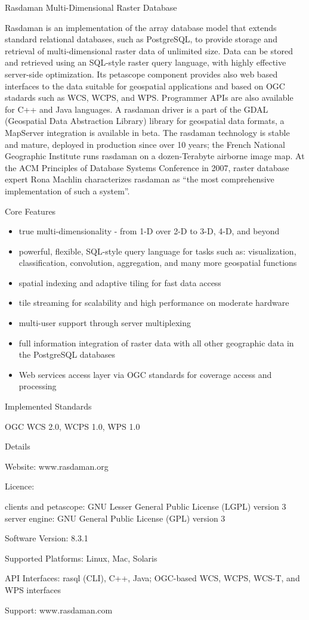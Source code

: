 
Rasdaman\newline 
Multi-Dimensional Raster Database\newline 

Rasdaman is an implementation of the array database model that extends standard relational databases, such as PostgreSQL, to provide storage and retrieval of multi-dimensional raster data of unlimited size. Data can be stored and retrieved using an SQL-style raster query language, with highly effective server-side optimization. Its petascope component provides also web based interfaces to the data suitable for geospatial applications and based on OGC stadards such as WCS, WCPS, and WPS. Programmer APIs are also available for C++ and Java languages. A rasdaman driver is a part of the GDAL (Geospatial Data Abstraction Library) library for geospatial data formats, a MapServer integration is available in beta.
\newline 
The rasdaman technology is stable and mature, deployed in production since over 10 years; the French National Geographic Institute runs rasdaman on a dozen-Terabyte airborne image map. At the ACM Principles of Database Systems Conference in 2007, raster database expert Rona Machlin characterizes rasdaman as “the most comprehensive implementation of such a system”.
\newline 

Core Features
\newline 
\begin{itemize}
 \item true multi-dimensionality - from 1-D over 2-D to 3-D, 4-D, and beyond
 \item powerful, flexible, SQL-style query language for tasks such as: visualization, classification, convolution, aggregation, and many more geospatial functions
 \item spatial indexing and adaptive tiling for fast data access
 \item tile streaming for scalability and high performance on moderate hardware
 \item multi-user support through server multiplexing
 \item full information integration of raster data with all other geographic data in the PostgreSQL databases
 \item Web services access layer via OGC standards for coverage access and processing
\end{itemize}

Implemented Standards

        OGC WCS 2.0, WCPS 1.0, WPS 1.0

Details

Website: www.rasdaman.org

Licence:

    clients and petascope: GNU Lesser General Public License (LGPL) version 3
    server engine: GNU General Public License (GPL) version 3

Software Version: 8.3.1

Supported Platforms: Linux, Mac, Solaris

API Interfaces: rasql (CLI), C++, Java; OGC-based WCS, WCPS, WCS-T, and WPS interfaces

Support: www.rasdaman.com
